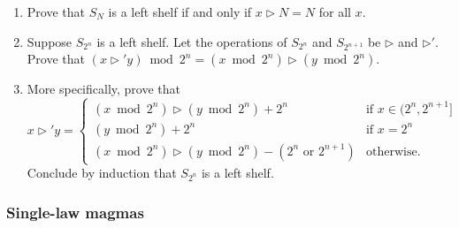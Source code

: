 \documentclass[11pt,paper=letter]{scrartcl}
\newcommand{\sleft}{\triangleright}
\begin{document}
\begin{enumerate}
\begin{enumerate}
\item Prove that $S_N$ is a left shelf if and only if $x \sleft N = N$ for all $x$.

\item Suppose $S_{2^n}$ is a left shelf. Let the operations of $S_{2^n}$ and $S_{2^{n+1}}$ be $\sleft$ and $\sleft'$. Prove that $(x \sleft' y) \bmod 2^n = (x \bmod 2^n) \sleft (y \bmod 2^n)$.

\item More specifically, prove that \[
  x \sleft' y = \begin{cases}
    (x \bmod 2^n) \sleft (y \bmod 2^n) + 2^n & \text{if $x \in (2^n, 2^{n + 1}]$} \\
    (y \bmod 2^n) + 2^n & \text{if $x = 2^n$} \\
    (x \bmod 2^n) \sleft (y \bmod 2^n) - (2^n \text{ or } 2^{n+1}) & \text{otherwise}.
  \end{cases}
\]
Conclude by induction that $S_{2^n}$ is a left shelf.
\end{enumerate}

\end{enumerate}

\subsubsection*{Single-law magmas}
\end{document}
